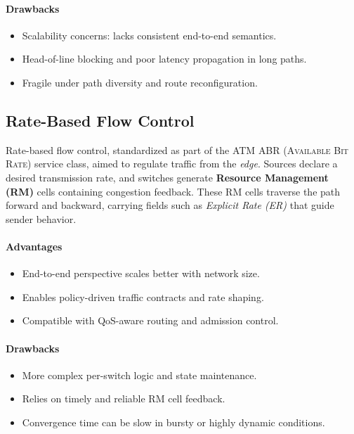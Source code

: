 \paragraph{Drawbacks}
\begin{itemize}
  \item Scalability concerns: lacks consistent end-to-end semantics.
  \item Head-of-line blocking and poor latency propagation in long paths.
  \item Fragile under path diversity and route reconfiguration.
\end{itemize}

\subsection{Rate-Based Flow Control}

Rate-based flow control, standardized as part of the ATM \textsc{ABR (Available Bit Rate)} service class, aimed to regulate traffic from the \textit{edge}. Sources declare a desired transmission rate, and switches generate \textbf{Resource Management (RM)} cells containing congestion feedback. These RM cells traverse the path forward and backward, carrying fields such as \textit{Explicit Rate (ER)} that guide sender behavior.

\paragraph{Advantages}
\begin{itemize}
  \item End-to-end perspective scales better with network size.
  \item Enables policy-driven traffic contracts and rate shaping.
  \item Compatible with QoS-aware routing and admission control.
\end{itemize}

\paragraph{Drawbacks}
\begin{itemize}
  \item More complex per-switch logic and state maintenance.
  \item Relies on timely and reliable RM cell feedback.
  \item Convergence time can be slow in bursty or highly dynamic conditions.
\end{itemize}


